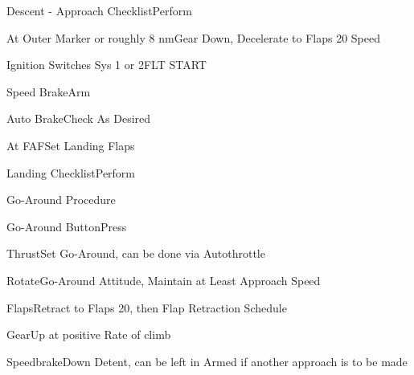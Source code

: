 \documentclass[sim-use, blue_items]{checklist}
\begin{document}
\begin{continuedchecklist}
{	}
	\item{Descent - Approach Checklist}{Perform}
	\item{At Outer Marker or roughly 8 nm}{Gear Down, Decelerate to Flaps 20 Speed}
	\item{Ignition Switches Sys 1 or 2}{FLT START}
	\item{Speed Brake}{Arm}
	\item{Auto Brake}{Check As Desired}
	\item{At FAF}{Set Landing Flaps}
	\item{Landing Checklist}{Perform}
\end{continuedchecklist}

\begin{checklist}{Go-Around Procedure}
	\item{Go-Around Button}{Press}
	\item{Thrust}{Set Go-Around, can be done via Autothrottle}
	\item{Rotate}{Go-Around Attitude, Maintain at Least Approach Speed}
	\item{Flaps}{Retract to Flaps 20, then Flap Retraction Schedule}
	\item{Gear}{Up at positive Rate of climb}
	\item{Speedbrake}{Down Detent, can be left in Armed if another approach is to be made}
\end{checklist}
\end{document}
